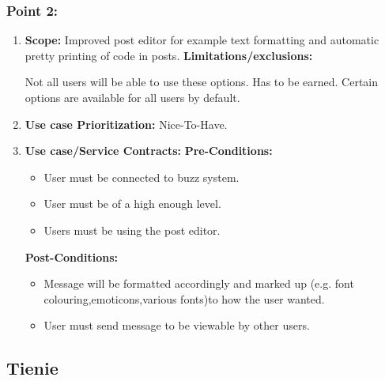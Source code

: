 \documentclass[11pt]{article}
\begin{document}
\subsubsection{Point 2:} 
\begin{enumerate}
\item 
\textbf{Scope:}
Improved post editor for example text formatting and automatic pretty printing of code in posts.
\newline
\textbf{Limitations/exclusions:} 

Not all users will be able to use these options. Has to be earned. Certain options are available for all users by default.

\item 
\textbf{Use case Prioritization:} Nice-To-Have.

\item 
\textbf{Use case/Service Contracts:} 
\newline
\textbf{Pre-Conditions: }
\begin{itemize}
\item User must be connected to buzz system.
\item User must be of a high enough level.
\item Users must be using the post editor.
\end{itemize}
 

\textbf{Post-Conditions: }
\begin{itemize}

\item Message will be formatted accordingly and marked up (e.g. font colouring,emoticons,various fonts)to how the user wanted. 
\item User must send message to be viewable by other users.
\end{itemize}
\end{enumerate}

\newpage

\graphicspath{ {../Diagrams/Tienie/Plagiarism/} }

\subsection{Tienie}
\end{document}
